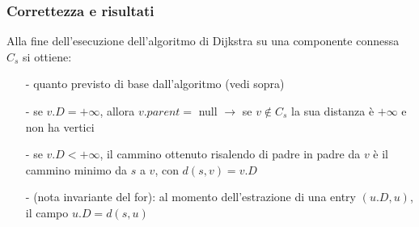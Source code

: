 \documentclass[a4paper]{article}
\begin{document}
\subsubsection*{Correttezza e risultati}
Alla fine dell'esecuzione dell'algoritmo di Dijkstra su una componente connessa \(C_s\) si ottiene:
\begin{itemize}[topsep=3pt, itemsep=0pt]
	\item[-] quanto previsto di base dall'algoritmo (vedi sopra)
	\item[-] se \(v.D = +\infty\), allora \(v.parent = \) null \(\rightarrow\) se \(v \notin C_s\) la sua distanza è \(+\infty\)
	e non ha vertici 
	\item[-] se \(v.D < +\infty\), il cammino ottenuto risalendo di padre in padre da \(v\) è il cammino minimo da \(s\) a \(v\),
	con \(d(s,v) = v.D\)
	\item[-] (nota invariante del for): al momento dell'estrazione di una entry \((u.D, u)\), il campo \(u.D = d(s,u)\)
\end{itemize}
\end{document}
